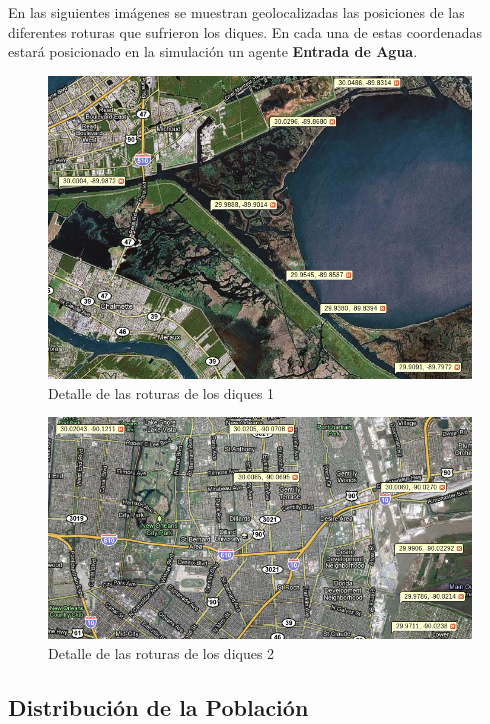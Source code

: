 En las siguientes imágenes se muestran geolocalizadas las posiciones de las
diferentes roturas que sufrieron los diques. En cada una de estas coordenadas
estará posicionado en la simulación un agente {\bf Entrada de Agua}.

\begin{figure}[H]
 \centering
 \includegraphics[width=135mm]{figuras/cap6/dikes1.png}
 \caption{Detalle de las roturas de los diques 1}
\end{figure}

\begin{figure}[H]
 \centering
 \includegraphics[width=135mm]{figuras/cap6/dikes2.png}
 \caption{Detalle de las roturas de los diques 2}
\end{figure}

\subsection{Distribución de la Población}

